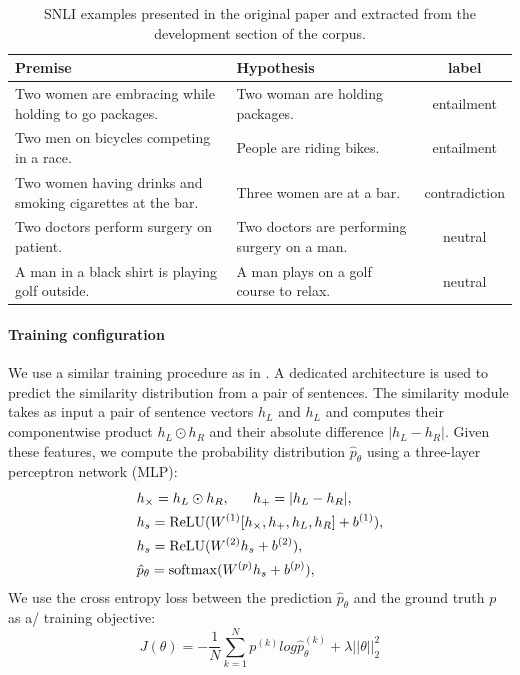 \begin{table}[!htb]
\centering
\footnotesize
\begin{tabularx}{16cm}{@{}X X c@{} }
  \toprule
Premise & Hypothesis & label \\
\midrule
\midrule 
Two women are embracing while holding to go packages. & Two woman are holding packages. & entailment\\
\rule{0pt}{3ex}Two men on bicycles competing in a race. & People are riding bikes. & entailment\\
\rule{0pt}{3ex}Two women having drinks and smoking cigarettes at the bar. & Three women are at a bar. & contradiction\\
\rule{0pt}{3ex}Two doctors perform surgery on patient. & Two doctors are performing surgery on a man. & neutral\\
\rule{0pt}{3ex}A man in a black shirt is playing golf outside. & A man plays on a golf course to relax. & neutral\\
\bottomrule
\end{tabularx}
\caption{ SNLI examples presented in the original paper \parencite{bowman_15} and extracted from the development section of the corpus.}
\end{table}

\paragraph{Training configuration}

We use a similar training procedure as in \textcite{choi_18}. A dedicated architecture is used to predict the similarity distribution from a pair of sentences. The similarity module takes as input a pair of sentence vectors $h_{L} $ and $h_{L}$ and computes their component\-wise product $h_{L} \odot h_{R}$ and their absolute difference $|h_{L} - h_{R}|$. Given these features, we compute the probability distribution  $\hat{p}_{\theta}$ using a three-layer perceptron network (MLP):
\begin{align}
\begin{split}
&h_{\times}=h_L\odot h_R, ~~~~~h_{+} = |h_L - h_R |, \\
&h_s = \operatorname{ReLU}(W^{(1)}[h_{\times}, h_{+}, h_L, h_R] + b^{(1)}), \\
&h_s = \operatorname{ReLU}(W^{(2)}h_s + b^{(2)}), \\
&\hat{p}_{\theta} = \operatorname{softmax}(W^{(p)}h_s + b^{(p)}),\\
\end{split}
\end{align}
We use the cross entropy loss between the prediction $\hat{p}_{\theta}$ and the ground truth $p$ as a/ training objective:
\begin{equation}
J(\theta) = -\frac{1}{N}\sum_{k=1}^{N}p^{(k)} log \hat{p}_{\theta}^{(k)} + \lambda||\theta||_{2}^{2}
\end{equation}

